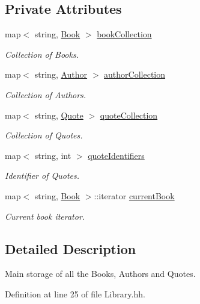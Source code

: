 \subsection*{Private Attributes}
\begin{DoxyCompactItemize}
\item 
map$<$ string, \hyperlink{class_book}{Book} $>$ \hyperlink{class_library_a5807d6d006ac0aa0a184831f0f2e5415}{book\-Collection}
\begin{DoxyCompactList}\small\item\em Collection of Books. \end{DoxyCompactList}\item 
map$<$ string, \hyperlink{class_author}{Author} $>$ \hyperlink{class_library_a7a6958a0dc85a1c816ca35727306cd62}{author\-Collection}
\begin{DoxyCompactList}\small\item\em Collection of Authors. \end{DoxyCompactList}\item 
map$<$ string, \hyperlink{class_quote}{Quote} $>$ \hyperlink{class_library_a84be5207332f4b2456af95907d0a43b5}{quote\-Collection}
\begin{DoxyCompactList}\small\item\em Collection of Quotes. \end{DoxyCompactList}\item 
map$<$ string, int $>$ \hyperlink{class_library_a58c1f12a0278872cd0299e586551bb7a}{quote\-Identifiers}
\begin{DoxyCompactList}\small\item\em Identifier of Quotes. \end{DoxyCompactList}\item 
map$<$ string, \hyperlink{class_book}{Book} $>$\-::iterator \hyperlink{class_library_a78a4071e8d610da671b3886c71900dae}{current\-Book}
\begin{DoxyCompactList}\small\item\em Current book iterator. \end{DoxyCompactList}\end{DoxyCompactItemize}


\subsection{Detailed Description}
Main storage of all the Books, Authors and Quotes. 

Definition at line 25 of file Library.\-hh.



